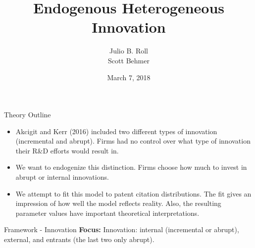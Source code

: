 \documentclass[11pt]{beamer}
\author{Julio B. Roll \\ Scott Behmer}
\title{Endogenous Heterogeneous Innovation}
\date{March 7, 2018}
\begin{document}
\begin{frame}
	\maketitle
\end{frame}

\begin{frame}{Theory Outline}
	\begin{itemize}\itemsep12pt
	\item Akcigit and Kerr (2016) included two different types of innovation (incremental and abrupt). Firms had no control over what type of innovation their R\&D efforts would result in.
	\item We want to endogenize this distinction. Firms choose how much to invest in abrupt or internal innovations.
	\item We attempt to fit this model to patent citation distributions. The fit gives an impression of how well the model reflects reality. Also, the resulting parameter values have important theoretical interpretations.
	\end{itemize}
\end{frame}

\begin{frame}{Framework - Innovation}
	\textbf{Focus:} Innovation: internal (incremental or abrupt), external, and entrants (the last two only abrupt).
	\begin{center}
	\begin{figure}\centering\label{Innov5}
	\end{figure}
	\end{center}
\end{frame}
\end{document}
